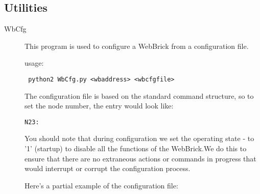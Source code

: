 \subsection{Utilities}

\begin{description}

\item[WbCfg]


This program is used to configure a WebBrick from a configuration file.

usage:  \begin{verbatim} python2 WbCfg.py <wbaddress> <wbcfgfile> \end{verbatim}

The configuration file is based on the standard command structure, so to set the node number, the entry would look like:

   \begin{verbatim}N23: \end{verbatim}

You should note that during configuration we set the operating state - to '1' (startup) to disable 
all the functions of the WebBrick.We do this to ensure that there are no extraneous actions or 
commands in progress that would interrupt or corrupt the configuration process.

Here's a partial example of the configuration file:



\end{description}